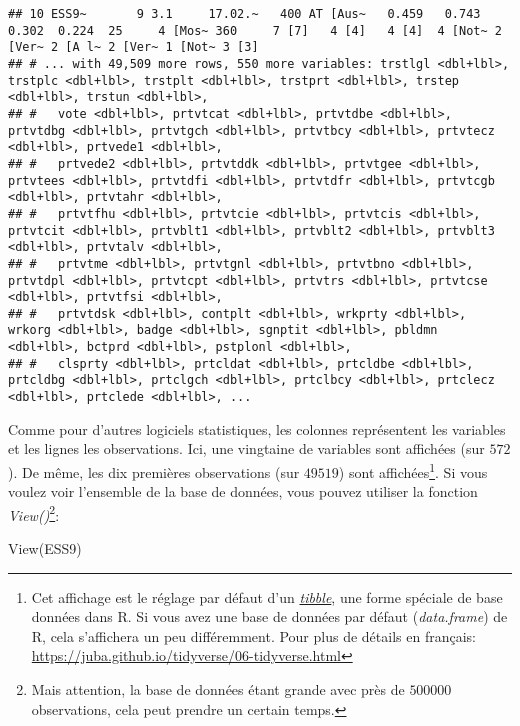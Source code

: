 \documentclass[
]{book}
\newenvironment{Shaded}{\begin{snugshade}}{\end{snugshade}}
\newcommand{\FunctionTok}[1]{\textcolor[rgb]{0.00,0.00,0.00}{#1}}
\newcommand{\NormalTok}[1]{#1}
\begin{document}
\begin{verbatim}
## 10 ESS9~       9 3.1     17.02.~   400 AT [Aus~   0.459   0.743   0.302  0.224  25     4 [Mos~ 360     7 [7]   4 [4]   4 [4]  4 [Not~ 2 [Ver~ 2 [A l~ 2 [Ver~ 1 [Not~ 3 [3]  
## # ... with 49,509 more rows, 550 more variables: trstlgl <dbl+lbl>, trstplc <dbl+lbl>, trstplt <dbl+lbl>, trstprt <dbl+lbl>, trstep <dbl+lbl>, trstun <dbl+lbl>,
## #   vote <dbl+lbl>, prtvtcat <dbl+lbl>, prtvtdbe <dbl+lbl>, prtvtdbg <dbl+lbl>, prtvtgch <dbl+lbl>, prtvtbcy <dbl+lbl>, prtvtecz <dbl+lbl>, prtvede1 <dbl+lbl>,
## #   prtvede2 <dbl+lbl>, prtvtddk <dbl+lbl>, prtvtgee <dbl+lbl>, prtvtees <dbl+lbl>, prtvtdfi <dbl+lbl>, prtvtdfr <dbl+lbl>, prtvtcgb <dbl+lbl>, prtvtahr <dbl+lbl>,
## #   prtvtfhu <dbl+lbl>, prtvtcie <dbl+lbl>, prtvtcis <dbl+lbl>, prtvtcit <dbl+lbl>, prtvblt1 <dbl+lbl>, prtvblt2 <dbl+lbl>, prtvblt3 <dbl+lbl>, prtvtalv <dbl+lbl>,
## #   prtvtme <dbl+lbl>, prtvtgnl <dbl+lbl>, prtvtbno <dbl+lbl>, prtvtdpl <dbl+lbl>, prtvtcpt <dbl+lbl>, prtvtrs <dbl+lbl>, prtvtcse <dbl+lbl>, prtvtfsi <dbl+lbl>,
## #   prtvtdsk <dbl+lbl>, contplt <dbl+lbl>, wrkprty <dbl+lbl>, wrkorg <dbl+lbl>, badge <dbl+lbl>, sgnptit <dbl+lbl>, pbldmn <dbl+lbl>, bctprd <dbl+lbl>, pstplonl <dbl+lbl>,
## #   clsprty <dbl+lbl>, prtcldat <dbl+lbl>, prtcldbe <dbl+lbl>, prtcldbg <dbl+lbl>, prtclgch <dbl+lbl>, prtclbcy <dbl+lbl>, prtclecz <dbl+lbl>, prtclede <dbl+lbl>, ...
\end{verbatim}

Comme pour d'autres logiciels statistiques, les colonnes représentent les variables et les lignes les observations. Ici, une vingtaine de variables sont affichées (sur \(572\)). De même, les dix premières observations (sur \(49519\)) sont affichées\footnote{Cet affichage est le réglage par défaut d'un \href{https://tibble.tidyverse.org/}{\emph{tibble}}, une forme spéciale de base données dans R. Si vous avez une base de données par défaut (\emph{data.frame}) de R, cela s'affichera un peu différemment. Pour plus de détails en français: \url{https://juba.github.io/tidyverse/06-tidyverse.html}}. Si vous voulez voir l'ensemble de la base de données, vous pouvez utiliser la fonction \emph{View()}\footnote{Mais attention, la base de données étant grande avec près de \(500000\) observations, cela peut prendre un certain temps.}:

\begin{Shaded}
\begin{Highlighting}[]
\FunctionTok{View}\NormalTok{(ESS9)}
\end{Highlighting}
\end{Shaded}
\end{document}
